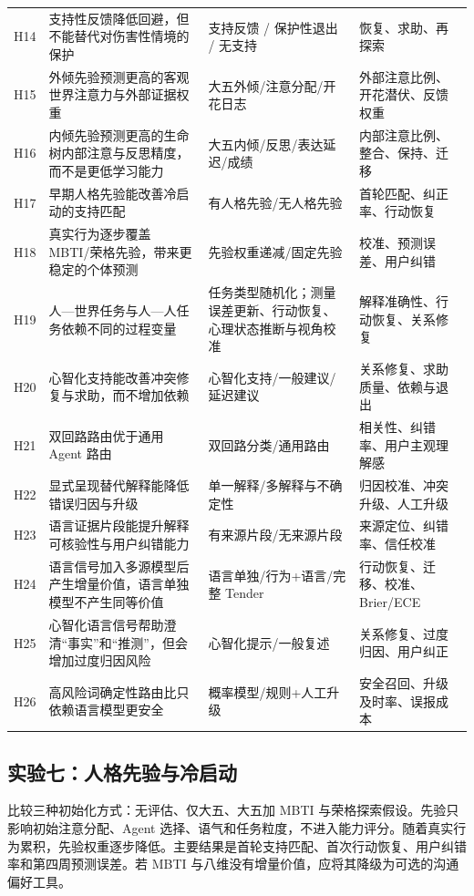 \documentclass[UTF8,a4paper,11pt]{ctexart}
\begin{document}
\begin{center}
\begin{longtable}{@{}p{1.4cm}p{4.5cm}p{5.2cm}p{3.4cm}@{}}
H14 & 支持性反馈降低回避，但不能替代对伤害性情境的保护 & 支持反馈 / 保护性退出 / 无支持 & 恢复、求助、再探索 \\
H15 & 外倾先验预测更高的客观世界注意力与外部证据权重 & 大五外倾/注意分配/开花日志 & 外部注意比例、开花潜伏、反馈权重 \\
H16 & 内倾先验预测更高的生命树内部注意与反思精度，而不是更低学习能力 & 大五内倾/反思/表达延迟/成绩 & 内部注意比例、整合、保持、迁移 \\
H17 & 早期人格先验能改善冷启动的支持匹配 & 有人格先验/无人格先验 & 首轮匹配、纠正率、行动恢复 \\
H18 & 真实行为逐步覆盖 MBTI/荣格先验，带来更稳定的个体预测 & 先验权重递减/固定先验 & 校准、预测误差、用户纠错 \\
H19 & 人—世界任务与人—人任务依赖不同的过程变量 & 任务类型随机化；测量误差更新、行动恢复、心理状态推断与视角校准 & 解释准确性、行动恢复、关系修复 \\
H20 & 心智化支持能改善冲突修复与求助，而不增加依赖 & 心智化支持/一般建议/延迟建议 & 关系修复、求助质量、依赖与退出 \\
H21 & 双回路路由优于通用 Agent 路由 & 双回路分类/通用路由 & 相关性、纠错率、用户主观理解感 \\
H22 & 显式呈现替代解释能降低错误归因与升级 & 单一解释/多解释与不确定性 & 归因校准、冲突升级、人工升级 \\
H23 & 语言证据片段能提升解释可核验性与用户纠错能力 & 有来源片段/无来源片段 & 来源定位、纠错率、信任校准 \\
H24 & 语言信号加入多源模型后产生增量价值，语言单独模型不产生同等价值 & 语言单独/行为+语言/完整 Tender & 行动恢复、迁移、校准、Brier/ECE \\
H25 & 心智化语言信号帮助澄清“事实”和“推测”，但会增加过度归因风险 & 心智化提示/一般复述 & 关系修复、过度归因、用户纠正 \\
H26 & 高风险词确定性路由比只依赖语言模型更安全 & 概率模型/规则+人工升级 & 安全召回、升级及时率、误报成本 \\
\bottomrule
\end{longtable}
\end{center}


\subsection{实验七：人格先验与冷启动}

比较三种初始化方式：无评估、仅大五、大五加 MBTI 与荣格探索假设。先验只影响初始注意分配、Agent 选择、语气和任务粒度，不进入能力评分。随着真实行为累积，先验权重逐步降低。主要结果是首轮支持匹配、首次行动恢复、用户纠错率和第四周预测误差。若 MBTI 与八维没有增量价值，应将其降级为可选的沟通偏好工具。
\end{document}
